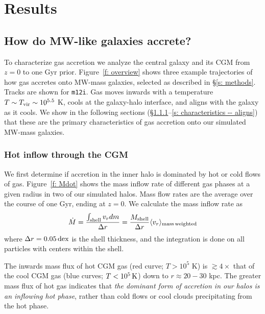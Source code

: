 \documentclass[fleqn,usenatbib]{mnras}
\newcommand{\Mdot}{\dot{M}}
\begin{document}
\section{Results}
\label{s: results}


\subsection{How do MW-like galaxies accrete?}
\label{s: characteristics}

To characterize gas accretion we analyze the central galaxy and its CGM from $z=0$ to one Gyr prior.
Figure~\ref{f: overview} shows three example trajectories of how gas accretes onto MW-mass galaxies, selected as described in \S\ref{s: methods}.
Tracks are shown for \texttt{m12i}.
Gas moves inwards with a temperature $T \sim T_{\rm vir} \sim 10^{5.5}$ K, cools at the galaxy-halo interface, and aligns with the galaxy as it cools.
We show in the following sections (\S\ref{s: characteristics -- inflowing gas phase}--\ref{s: characteristics -- aligns}) that these are the primary characteristics of gas accretion onto our simulated MW-mass galaxies.

\subsubsection{Hot inflow through the CGM}
\label{s: characteristics -- inflowing gas phase}

We first determine if accretion in the inner halo is dominated by hot or cold flows of gas.
Figure~\ref{f: Mdot} shows the mass inflow rate of different gas phases at a given radius in two of our simulated halos.
Mass flow rates are the average over the course of one Gyr, ending at $z=0$.
We calculate the mass inflow rate as
\begin{equation}
     \Mdot = \frac{\int_{\rm shell} v_r dm}{\Delta r} = \frac{M_{\rm shell}}{\Delta r} \langle v_r\rangle_{\rm mass\, weighted}
     \label{e: Mdot}
\end{equation}
where $\Delta r=0.05\,{\rm dex}$ is the shell thickness, and the integration is done on all particles with centers within the shell.

The inwards mass flux of hot CGM gas (red curve; $T>10^5$ K)  is $\gtrsim 4\times$ that of the cool CGM gas (blue curves; $T < 10^5\,{\rm K}$) down to $r \approx 20-30$ kpc.
The greater mass flux of hot gas indicates that \textit{the dominant form of accretion in our halos is an inflowing hot phase}, rather than cold flows or cool clouds precipitating from the hot phase. 
\end{document}
